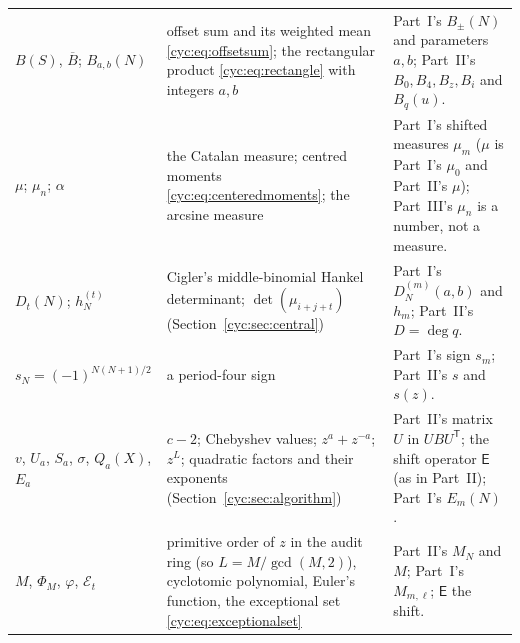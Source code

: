 \documentclass[11pt,a4paper]{article}
\numberwithin{equation}{section}
\theoremstyle{definition}
\theoremstyle{remark}
\newcommand{\E}{\mathsf E}
\begin{document}
\begin{longtable}{@{}>{\raggedright}p{}>{\raggedright}p{}>{\raggedright\arraybackslash}p{}@{}}
$B(S)$, $\overline B$; $B_{a,b}(N)$
 & offset sum and its weighted mean \eqref{cyc:eq:offsetsum}; the
   rectangular product \eqref{cyc:eq:rectangle} with integers $a,b$
 & Part~I's $B_\pm(N)$ and parameters $a,b$; Part~II's $B_0,B_4,B_z,B_i$
   and $B_q(u)$.\\
$\mu$; $\mu_n$; $\alpha$
 & the Catalan measure; centred moments \eqref{cyc:eq:centeredmoments};
   the arcsine measure
 & Part~I's shifted measures $\mu_m$ ($\mu$ is Part~I's $\mu_0$ and
   Part~II's $\mu$); Part~III's $\mu_n$ is a number, not a measure.\\
$D_t(N)$; $h_N^{(t)}$
 & Cigler's middle-binomial Hankel determinant; $\det(\mu_{i+j+t})$
   (Section~\ref{cyc:sec:central})
 & Part~I's $D_N^{(m)}(a,b)$ and $h_m$; Part~II's $D=\deg q$.\\
$s_N=(-1)^{N(N+1)/2}$
 & a period-four sign
 & Part~I's sign $s_m$; Part~II's $s$ and $s(z)$.\\
$v$, $U_a$, $S_a$, $\sigma$, $Q_a(X)$, $E_a$
 & $c-2$; Chebyshev values; $z^a+z^{-a}$; $z^L$; quadratic factors and
   their exponents (Section~\ref{cyc:sec:algorithm})
 & Part~II's matrix $U$ in $UBU^{\mathsf T}$; the shift operator $\E$
   (as in Part~II); Part~I's $E_m(N)$.\\
$M$, $\Phi_M$, $\varphi$, $\mathcal E_t$
 & primitive order of $z$ in the audit ring (so $L=M/\gcd(M,2)$),
   cyclotomic polynomial, Euler's function, the exceptional set
   \eqref{cyc:eq:exceptionalset}
 & Part~II's $M_N$ and $M$; Part~I's $M_{m,\ell}$; $\E$ the shift.\\
\end{longtable}
\endgroup
\end{document}
